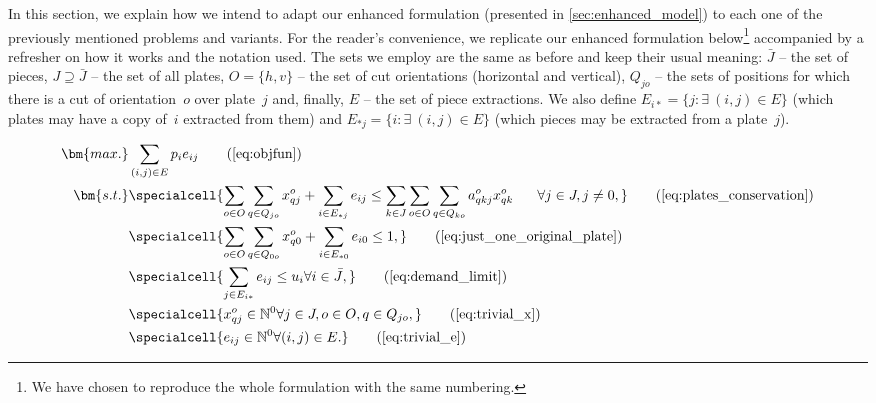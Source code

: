 In this section, we explain how we intend to adapt our enhanced formulation (presented in \cref{sec:enhanced_model}) to each one of the previously mentioned problems and variants.
For the reader's convenience, we replicate our enhanced formulation below\footnote{We have chosen to reproduce the whole formulation with the same numbering.} accompanied by a refresher on how it works and the notation used.
The sets we employ are the same as before and keep their usual meaning: \(\bar{J}\) -- the set of pieces, \(J \supseteq \bar{J}\) -- the set of all plates, \(O = \{h, v\}\) -- the set of cut orientations (horizontal and vertical), \(Q_{jo}\) -- the sets of positions for which there is a cut of orientation~\(o\) over plate~\(j\) and, finally, \(E\) -- the set of piece extractions.
We also define \(E_{i*} = \{ j : \exists~(i, j) \in E \}\) (which plates may have a copy of~\(i\) extracted from them) and \(E_{*j} = \{i : \exists~(i, j) \in E \}\) (which pieces may be extracted from a plate~\(j\)).

\begin{align*}
\bm{max.} &\sum_{(i, j) \in E} p_i e_{ij} \tag{\ref{eq:objfun}}\\
\bm{s.t.} &\specialcell{\sum_{o \in O}\sum_{q \in Q_{jo}} x^o_{qj} + \sum_{i \in E_{*j}} e_{ij} \leq \sum_{k \in J}\sum_{o \in O}\sum_{q \in Q_{ko}} a^o_{qkj} x^o_{qk} \hspace*{0.05\textwidth} \forall j \in J, j \neq 0,}\tag{\ref{eq:plates_conservation}}\\
	    & \specialcell{\sum_{o \in O}\sum_{q \in Q_{0o}} x^o_{q0} + \sum_{i \in E_{*0}} e_{i0} \leq 1 \hspace*{\fill},}\tag{\ref{eq:just_one_original_plate}}\\
            & \specialcell{\sum_{j \in E_{i*}} e_{ij} \leq u_i \hspace*{\fill} \forall i \in \bar{J},}\tag{\ref{eq:demand_limit}}\\
	    & \specialcell{x^o_{qj} \in \mathbb{N}^0 \hspace*{\fill} \forall j \in J, o \in O, q \in Q_{jo},}\tag{\ref{eq:trivial_x}}\\
            & \specialcell{e_{ij} \in \mathbb{N}^0 \hspace*{\fill} \forall (i, j) \in E.}\tag{\ref{eq:trivial_e}}
\end{align*}

